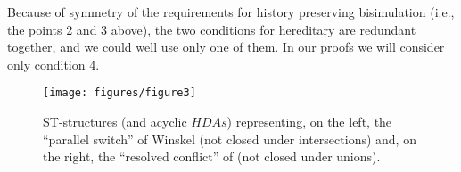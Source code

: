 \documentclass[submission,copyright,creativecommons]{eptcs}
\newcommand\HDAs{\ensuremath{\mathit{HDAs}}}
\begin{document}
Because of symmetry of the requirements for history preserving bisimulation (i.e., the points 2 and 3 above), the two conditions for hereditary are redundant together, and we could well use only one of them. In our proofs we will consider only condition 4.



\begin{figure}[tp]
\begin{center}
    \texttt{[image: figures/figure3]}
  \end{center}
\caption{ST-structures (and acyclic \HDAs) representing, on the left, the ``parallel switch'' of Winskel \cite[Ex.1.1.7]{Winskel86} (not closed under intersections) and, on the right, the ``resolved conflict'' of \cite[Ex.2]{GlabbeekP09configStruct} (not closed under unions).}
\label{fig_ex_winskel}
\end{figure}
\end{document}
